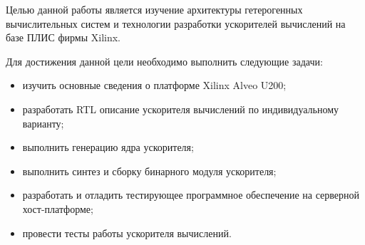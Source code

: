 
	Целью данной работы является изучение архитектуры гетерогенных вычислительных систем и технологии разработки ускорителей вычислений на базе ПЛИС фирмы Xilinx.

Для достижения данной цели необходимо выполнить следующие задачи:
\begin{itemize}
	\item изучить основные сведения о платформе Xilinx Alveo U200;
	\item разработать RTL описание ускорителя вычислений по индивидуальному варианту;
	\item выполнить генерацию ядра ускорителя;
	\item выполнить синтез и сборку бинарного модуля ускорителя;
	\item разработать и отладить тестирующее программное обеспечение на серверной хост-платформе;
	\item провести тесты работы ускорителя вычислений.
\end{itemize}
